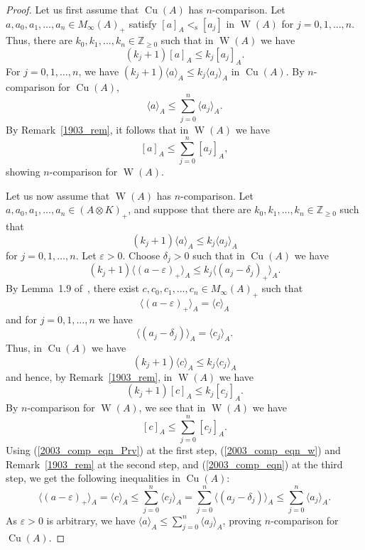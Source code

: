 \documentclass[10pt]{amsart}
\numberwithin{equation}{section}
\theoremstyle{definition}
\newcommand{\ep}{\varepsilon}
\newcommand{\Nz}{{\mathbb{Z}}_{\geq 0}}
\newcommand{\Cu}{{\operatorname{Cu}}}
\newcommand{\W}{{\operatorname{W}}}
\newcommand{\cc}[1]{\langle #1 \rangle}
\newcommand{\les}{<_{\operatorname{s}}}
\begin{document}
\begin{proof}
Let us first assume that $\Cu (A)$ has $n$-comparison.
Let $a, a_0, a_1, \hdots, a_n \in M_{\infty}(A)_+$ satisfy
$[a]_A \les [a_j]$ in $\W (A)$ for $j = 0, 1, \hdots, n$.
Thus, there are $k_0, k_1, \hdots, k_n \in \Nz$
such that in $\W (A)$ we have
%
\begin{equation*}
(k_j + 1) [a]_A \leq k_j [a_j]_A.
\end{equation*}
%
For $j = 0, 1, \hdots, n$, we have
$(k_j + 1) \cc{a}_A \leq k_j \cc{a_j}_A$ in $\Cu (A)$.
By $n$-comparison for $\Cu (A)$,
%
\begin{equation*}
\cc{a}_A \leq \sum_{j = 0}^n \cc{a_j}_A.
\end{equation*}
%
By Remark~\ref{1903_rem}, it follows that in $\W (A)$ we have
\[
[a]_A \leq \sum_{j = 0}^n [a_j]_A,
\]
showing $n$-comparison for $\W (A)$.

Let us now assume that $\W (A)$ has $n$-comparison.
Let $a, a_0, a_1, \hdots, a_n \in (A \otimes K)_+$,
and suppose that there are $k_0, k_1, \hdots, k_n \in \Nz$ such that
%
\begin{equation*}
(k_j + 1) \cc{a}_A \leq k_j \cc{a_j}_A
\end{equation*}
%
for $j = 0, 1, \hdots, n$.
Let $\ep > 0$.
Choose $\delta_j > 0$ such that in $\Cu (A)$ we have
\[
(k_j + 1) \cc{(a - \ep)_+}_A  \leq k_j \cc{(a_j- \delta_j)_+}_A.
\]
By Lemma~1.9 of~\cite{Phl40}, there exist
$c, c_0, c_1, \hdots, c_n \in M_{\infty}(A)_+$ such that
%
\begin{equation}\label{2003_comp_eqn_Prv}
\cc{(a - \ep)_+}_A = \cc{c}_A
\end{equation}
%
and for $j = 0, 1, \hdots, n$ we have
%
\begin{equation}\label{2003_comp_eqn}
\cc{(a_j- \delta_j)}_A = \cc{c_j}_A.
\end{equation}
%
Thus, in $\Cu (A)$ we have
\[
(k_j + 1) \cc{c}_A \leq k_j \cc{c_j}_A
\]
and hence, by Remark~\ref{1903_rem}, in $\W (A)$ we have
\[
(k_j + 1) [c]_A \leq k_j [c_j]_A.
\]
By $n$-comparison for $\W (A)$, we see that in $\W (A)$ we have
%
\begin{equation}\label{2003_comp_eqn_w}
[c]_A \leq \sum_{j = 0}^n [c_j]_A.
\end{equation}
%
Using (\ref{2003_comp_eqn_Prv}) at the first step,
(\ref{2003_comp_eqn_w}) and Remark~\ref{1903_rem} at the second step,
and (\ref{2003_comp_eqn}) at the third step,
we get the following inequalities in $\Cu (A)$:
\[
\cc{(a - \ep)_+}_A = \cc{c}_A \leq \sum_{j = 0}^n \cc{c_j}_A
 = \sum_{j = 0}^n \cc{(a_j- \delta_j)}_A \leq \sum_{j = 0}^n \cc{a_j}_A.
\]
As $\ep > 0$ is arbitrary, we have
$\cc{a}_A \leq \sum_{j = 0}^n \cc{a_j}_A$,
proving $n$-comparison for $\Cu (A)$.
\end{proof}
\end{document}
